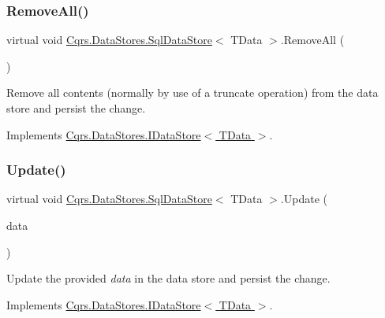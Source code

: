 \subsubsection{\texorpdfstring{Remove\+All()}{RemoveAll()}}
{\footnotesize\ttfamily virtual void \hyperlink{classCqrs_1_1DataStores_1_1SqlDataStore}{Cqrs.\+Data\+Stores.\+Sql\+Data\+Store}$<$ T\+Data $>$.Remove\+All (\begin{DoxyParamCaption}{ }\end{DoxyParamCaption})\hspace{0.3cm}{\ttfamily [virtual]}}



Remove all contents (normally by use of a truncate operation) from the data store and persist the change. 



Implements \hyperlink{interfaceCqrs_1_1DataStores_1_1IDataStore_aead8d7a39a717d29af05daf7b64bea94_aead8d7a39a717d29af05daf7b64bea94}{Cqrs.\+Data\+Stores.\+I\+Data\+Store$<$ T\+Data $>$}.

\mbox{\label{classCqrs_1_1DataStores_1_1SqlDataStore_a8f85191cecef92d003620d4064584bb2_a8f85191cecef92d003620d4064584bb2}} 
\subsubsection{\texorpdfstring{Update()}{Update()}}
{\footnotesize\ttfamily virtual void \hyperlink{classCqrs_1_1DataStores_1_1SqlDataStore}{Cqrs.\+Data\+Stores.\+Sql\+Data\+Store}$<$ T\+Data $>$.Update (\begin{DoxyParamCaption}\item[{T\+Data}]{data }\end{DoxyParamCaption})\hspace{0.3cm}{\ttfamily [virtual]}}



Update the provided {\itshape data}  in the data store and persist the change. 



Implements \hyperlink{interfaceCqrs_1_1DataStores_1_1IDataStore_a6d5d4dd572de8db01ff0c48d37faefa7_a6d5d4dd572de8db01ff0c48d37faefa7}{Cqrs.\+Data\+Stores.\+I\+Data\+Store$<$ T\+Data $>$}.



